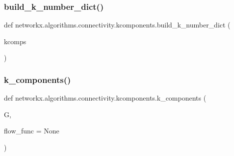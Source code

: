 \subsubsection{\texorpdfstring{build\+\_\+k\+\_\+number\+\_\+dict()}{build\_k\_number\_dict()}}
{\footnotesize\ttfamily def networkx.\+algorithms.\+connectivity.\+kcomponents.\+build\+\_\+k\+\_\+number\+\_\+dict (\begin{DoxyParamCaption}\item[{}]{kcomps }\end{DoxyParamCaption})}

\mbox{\label{namespacenetworkx_1_1algorithms_1_1connectivity_1_1kcomponents_ae2314668d4376801aeb121c05ab0f8c2}} 
\subsubsection{\texorpdfstring{k\+\_\+components()}{k\_components()}}
{\footnotesize\ttfamily def networkx.\+algorithms.\+connectivity.\+kcomponents.\+k\+\_\+components (\begin{DoxyParamCaption}\item[{}]{G,  }\item[{}]{flow\+\_\+func = {\ttfamily None} }\end{DoxyParamCaption})}

